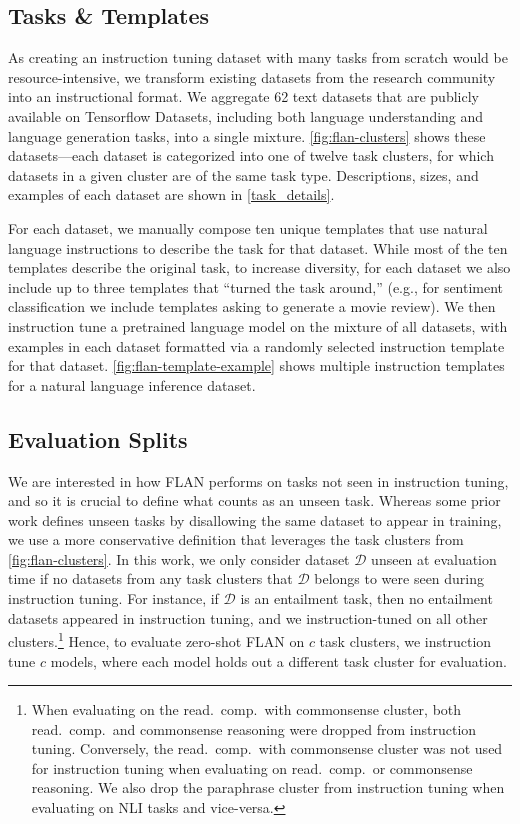 \subsection{Tasks \& Templates}\label{subsec:tasks_and_templates}
As creating an instruction tuning dataset with many tasks from scratch would be resource-intensive, we transform existing datasets from the research community into an instructional format. We aggregate 62 text datasets that are publicly available on Tensorflow Datasets, including both language understanding and language generation tasks, into a single mixture.
\ref{fig:flan-clusters} shows these datasets---each dataset is categorized into one of twelve task clusters, for which datasets in a given cluster are of the same task type. Descriptions, sizes, and examples of each dataset are shown in \ref{task_details}.

For each dataset, we manually compose ten unique templates that use natural language instructions to describe the task for that dataset. While most of the ten templates describe the original task, to increase diversity, for each dataset we also include up to three templates that ``turned the task around,'' (e.g., for sentiment classification we include templates asking to generate a movie review). We then instruction tune a pretrained language model on the mixture of all datasets, with examples in each dataset formatted via a randomly selected instruction template for that dataset.
\ref{fig:flan-template-example} shows multiple instruction templates for a natural language inference dataset.

\subsection{Evaluation Splits}\label{subsec:eval_splits}
We are interested in how FLAN performs on tasks not seen in instruction tuning, and so it is crucial to define what counts as an unseen task. Whereas some prior work defines unseen tasks by disallowing the same dataset to appear in training, we use a more conservative definition that leverages the task clusters from \ref{fig:flan-clusters}.
In this work, we only consider dataset $\mathcal{D}$ unseen at evaluation time if no datasets from any task clusters that $\mathcal{D}$ belongs to were seen during instruction tuning. For instance, if $\mathcal{D}$ is an entailment task, then no entailment datasets appeared in instruction tuning, and we instruction-tuned on all other clusters.\footnote{When evaluating on the read.\ comp.\ with commonsense cluster, both read.\ comp.\ and commonsense reasoning were dropped from instruction tuning. Conversely, the read.\ comp.\ with commonsense cluster was not used for instruction tuning when evaluating on read.\ comp.\ or commonsense reasoning. We also drop the paraphrase cluster from instruction tuning when evaluating on NLI tasks and vice-versa.} Hence, to evaluate zero-shot FLAN on $c$ task clusters, we instruction tune $c$ models, where each model holds out a different task cluster for evaluation.

